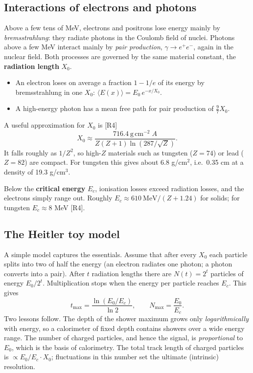 \documentclass[11pt,letterpaper]{article}
\begin{document}
\subsection{Interactions of electrons and photons}
Above a few tens of MeV, electrons and positrons lose energy mainly by \emph{bremsstrahlung}: they radiate photons in the Coulomb field of nuclei.
Photons above a few MeV interact mainly by \emph{pair production}, $\gamma\to e^+e^-$, again in the nuclear field.
Both processes are governed by the same material constant, the \textbf{radiation length} $X_0$.
\begin{itemize}
\item An electron loses on average a fraction $1-1/e$ of its energy by bremsstrahlung in one $X_0$: $\langle E(x)\rangle=E_0\,e^{-x/X_0}$.
\item A high-energy photon has a mean free path for pair production of $\tfrac{9}{7}X_0$.
\end{itemize}
A useful approximation for $X_0$ is [R4]
\begin{equation}
X_0\approx\frac{716.4\ \mathrm{g\,cm^{-2}}\;A}{Z(Z+1)\ln(287/\sqrt{Z})}.
\end{equation}
It falls roughly as $1/Z^2$, so high-$Z$ materials such as tungsten ($Z=74$) or lead ($Z=82$) are compact.
For tungsten this gives about 6.8 g/cm$^2$, i.e.\ 0.35 cm at a density of 19.3 g/cm$^3$.

Below the \textbf{critical energy} $E_c$, ionisation losses exceed radiation losses, and the electrons simply range out.
Roughly $E_c\approx 610\ \mathrm{MeV}/(Z+1.24)$ for solids; for tungsten $E_c\approx 8$ MeV [R4].

\subsection{The Heitler toy model}
A simple model captures the essentials.
Assume that after every $X_0$ each particle splits into two of half the energy (an electron radiates one photon; a photon converts into a pair).
After $t$ radiation lengths there are $N(t)=2^t$ particles of energy $E_0/2^t$.
Multiplication stops when the energy per particle reaches $E_c$.
This gives
\begin{equation}
t_{\max}=\frac{\ln(E_0/E_c)}{\ln2},\qquad N_{\max}=\frac{E_0}{E_c}.
\end{equation}
Two lessons follow.
The depth of the shower maximum grows only \emph{logarithmically} with energy, so a calorimeter of fixed depth contains showers over a wide energy range.
The number of charged particles, and hence the signal, is \emph{proportional} to $E_0$, which is the basis of calorimetry.
The total track length of charged particles is $\propto E_0/E_c\cdot X_0$; fluctuations in this number set the ultimate (intrinsic) resolution.
\end{document}
